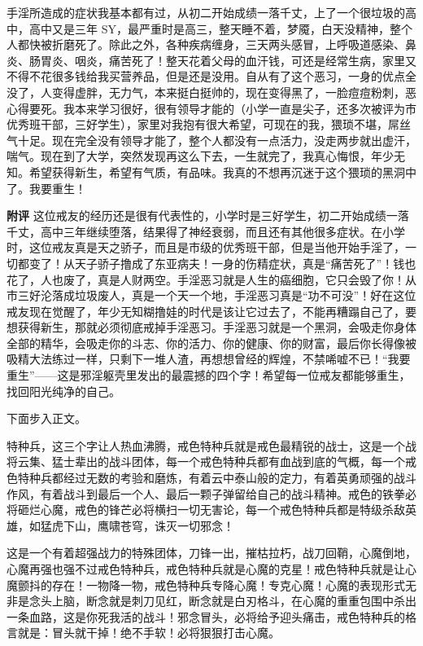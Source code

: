 \begin{case}
    手淫所造成的症状我基本都有过，从初二开始成绩一落千丈，上了一个很垃圾的高中，高中又是三年 SY，最严重时是高三，整天睡不着，梦魇，白天没精神，整个人都快被折磨死了。除此之外，各种疾病缠身，三天两头感冒，上呼吸道感染、鼻炎、肠胃炎、咽炎，痛苦死了！整天花着父母的血汗钱，可还是经常生病，家里又不得不花很多钱给我买营养品，但是还是没用。自从有了这个恶习，一身的优点全没了，人变得虚胖，无力气，本来挺白挺帅的，现在变得黑了，一脸痘痘粉刺，恶心得要死。我本来学习很好，很有领导才能的（小学一直是尖子，还多次被评为市优秀班干部，三好学生），家里对我抱有很大希望，可现在的我，猥琐不堪，屌丝气十足。现在完全没有领导才能了，整个人都没有一点活力，没走两步就出虚汗，喘气。现在到了大学，突然发现再这么下去，一生就完了，我真心悔恨，年少无知。希望获得新生，希望有气质，有品味。我真的不想再沉迷于这个猥琐的黑洞中了。我要重生！

    \textbf{附评} 这位戒友的经历还是很有代表性的，小学时是三好学生，初二开始成绩一落千丈，高中三年继续堕落，结果得了神经衰弱，而且还有其他很多症状。在小学时，这位戒友真是天之骄子，而且是市级的优秀班干部，但是当他开始手淫了，一切都变了！从天子骄子撸成了东亚病夫！一身的伤精症状，真是“痛苦死了”！钱也花了，人也废了，真是人财两空。手淫恶习就是人生的癌细胞，它只会毁了你！从市三好沦落成垃圾废人，真是一个天一个地，手淫恶习真是“功不可没”！好在这位戒友现在觉醒了，年少无知糊撸娃的时代是该让它过去了，不能再糟蹋自己了，要想获得新生，那就必须彻底戒掉手淫恶习。手淫恶习就是一个黑洞，会吸走你身体全部的精华，会吸走你的斗志、你的活力、你的健康、你的财富，最后你长得像被吸精大法练过一样，只剩下一堆人渣，再想想曾经的辉煌，不禁唏嘘不已！“我要重生”——这是邪淫躯壳里发出的最震撼的四个字！希望每一位戒友都能够重生，找回阳光纯净的自己。
\end{case}

下面步入正文。

特种兵，这三个字让人热血沸腾，戒色特种兵就是戒色最精锐的战士，这是一个战将云集、猛士辈出的战斗团体，每一个戒色特种兵都有血战到底的气概，每一个戒色特种兵都经过无数的考验和磨炼，有着云中泰山般的定力，有着英勇顽强的战斗作风，有着战斗到最后一个人、最后一颗子弹留给自己的战斗精神。戒色的铁拳必将砸烂心魔，戒色的锋芒必将横扫一切无害论，每一个戒色特种兵都是特级杀敌英雄，如猛虎下山，鹰啸苍穹，诛灭一切邪念！

这是一个有着超强战力的特殊团体，刀锋一出，摧枯拉朽，战刀回鞘，心魔倒地，心魔再强也强不过戒色特种兵，戒色特种兵就是心魔的克星！戒色特种兵就是让心魔颤抖的存在！一物降一物，戒色特种兵专降心魔！专克心魔！心魔的表现形式无非是念头上脑，断念就是刺刀见红，断念就是白刃格斗，在心魔的重重包围中杀出一条血路，这是你死我活的战斗！邪念冒头，必将给予迎头痛击，戒色特种兵的格言就是：冒头就干掉！绝不手软！必将狠狠打击心魔。

